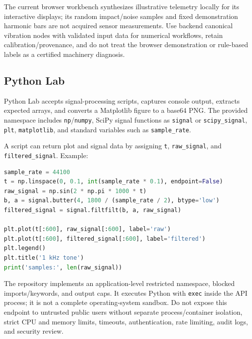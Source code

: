 \documentclass[10pt,a4paper]{article}
\newcommand{\code}[1]{\nolinkurl{#1}}
\begin{document}
\begin{warningbox}[title={Vibration data boundary}]
The current browser workbench synthesizes illustrative telemetry locally for its interactive displays; its random impact/noise samples and fixed demonstration harmonic bars are not acquired sensor measurements. Use backend canonical vibration nodes with validated input data for numerical workflows, retain calibration/provenance, and do not treat the browser demonstration or rule-based labels as a certified machinery diagnosis.
\end{warningbox}

\subsection{Python Lab}

Python Lab accepts signal-processing scripts, captures console output, extracts expected arrays, and converts a Matplotlib figure to a base64 PNG. The provided namespace includes \code{np}/\code{numpy}, SciPy signal functions as \code{signal} or \code{scipy\_signal}, \code{plt}, \code{matplotlib}, and standard variables such as \code{sample\_rate}.

A script can return plot and signal data by assigning \code{t}, \code{raw\_signal}, and \code{filtered\_signal}. Example:

\begin{lstlisting}[language=Python]
sample_rate = 44100
t = np.linspace(0, 0.1, int(sample_rate * 0.1), endpoint=False)
raw_signal = np.sin(2 * np.pi * 1000 * t)
b, a = signal.butter(4, 1800 / (sample_rate / 2), btype='low')
filtered_signal = signal.filtfilt(b, a, raw_signal)

plt.plot(t[:600], raw_signal[:600], label='raw')
plt.plot(t[:600], filtered_signal[:600], label='filtered')
plt.legend()
plt.title('1 kHz tone')
print('samples:', len(raw_signal))
\end{lstlisting}

\begin{warningbox}[title={Security boundary}]
The repository implements an application-level restricted namespace, blocked imports/keywords, and output caps. It executes Python with \code{exec} inside the API process; it is not a complete operating-system sandbox. Do not expose this endpoint to untrusted public users without separate process/container isolation, strict CPU and memory limits, timeouts, authentication, rate limiting, audit logs, and security review.
\end{warningbox}
\end{document}
